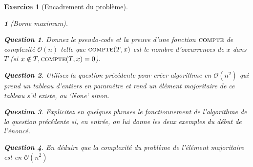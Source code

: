 \documentclass{article}
\theoremstyle{exostyle}
\newtheorem{exo}{Exercice}
\theoremstyle{partiestyle}
\newtheorem{partie}{}[exo]
\theoremstyle{questionstyle}
\newtheorem{questionpartie}{Question}[partie]
\begin{document}
\begin{exo}[Encadrement du problème]
\begin{partie}[Borne maximum]
\begin{questionpartie}
    Donnez le pseudo-code et la preuve d'une fonction $\textsc{compte}$ de complexité $\mathcal{O}(n)$ telle que $\textsc{compte}(T, x)$ est le nombre d'occurrences de $x$ dans $T$ (si $x\notin T, \textsc{compte}(T, x) = 0$).
\end{questionpartie}
\begin{questionpartie}
    \label{naif}
    Utilisez la question précédente pour créer algorithme en $\mathcal{O}(n^2)$ qui prend un tableau d'entiers en paramètre et rend un élément majoritaire de ce tableau s'il existe, ou `None` sinon.
\end{questionpartie}
\begin{questionpartie}
    Explicitez en quelques phrases le fonctionnement de l'algorithme de la question précédente si, en entrée, on lui donne les deux exemples du début de l'énoncé. 
\end{questionpartie}            
\begin{questionpartie}
    En déduire que la complexité du problème de l'élément majoritaire est en $\mathcal{O}(n^2)$
\end{questionpartie}
\end{partie}

\end{exo}
\end{document}
